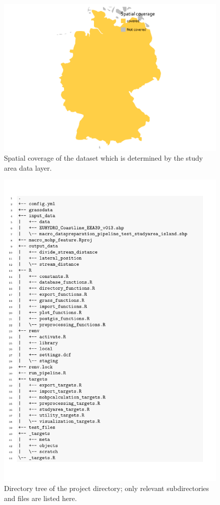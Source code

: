 \documentclass[fleqn,10pt]{wlscirep}
\begin{document}
\normalsize

\footnotesize

\begin{figure}[H]

{\centering \includegraphics[width=1\linewidth]{data_descriptor/tex/figure-studyareafigure-1} 

}

\caption{Spatial coverage of the dataset which is determined by the study area data layer.}\label{fig:studyareafigure}
\end{figure}

\normalsize

\footnotesize

\begin{figure}[H]

{\centering \includegraphics[width=0.7\linewidth]{data_descriptor/tex/directory_tree} 

}

\caption{Directory tree of the project directory; only relevant subdirectories and files are listed here.}\label{fig:projectdirtree}
\end{figure}
\end{document}
